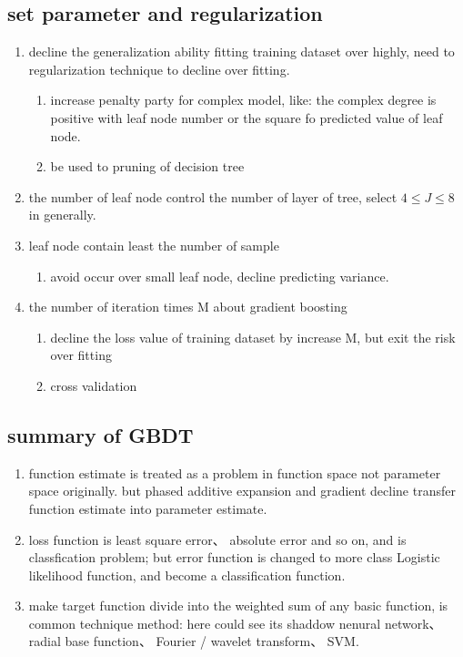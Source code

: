\documentclass[12pt]{ctexart}%
\begin{document}
		\subsection{\quad set parameter and regularization }
			\begin{enumerate}
				\item decline the generalization ability fitting training dataset over highly, need to regularization technique to decline over fitting.
					\begin{enumerate}
						\item increase penalty party for complex model, like: the complex degree is positive with leaf node number or the square fo predicted value of leaf node.
						
						\item be used to pruning of decision tree
					\end{enumerate}
				
				\item the number of leaf node control the number of layer of tree, select $4\leq J \leq 8$ in generally.
				
				\item leaf node contain least the number of sample
					\begin{enumerate}
						\item avoid occur over small leaf node, decline predicting variance.
					\end{enumerate}
				
				\item the number of iteration times M about gradient boosting
					\begin{enumerate}
						\item decline the loss value of training dataset by increase M, but exit the risk over fitting
						
						\item cross validation
					\end{enumerate} 
			\end{enumerate}
		
		\subsection{\quad summary of GBDT}
			\begin{enumerate}
				\item function estimate is treated as a problem in function space not parameter space originally. but phased additive expansion and gradient decline transfer function estimate into parameter estimate.
				
				\item loss function is least square error、 absolute error and so on, and is classfication problem; but error function is changed to more class Logistic likelihood function, and become a classification function.
				
				\item make target function divide into the weighted sum of any basic function, is common technique method: here could see its shaddow nenural network、 radial base function、 Fourier / wavelet transform、 SVM.
			\end{enumerate}
		
\end{document}
